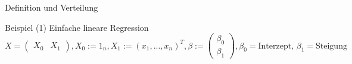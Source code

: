 \documentclass[
  8pt,
  ignorenonframetext,
]{beamer}
\begin{document}
\begin{frame}[fragile]{Definition und Verteilung}
\protect\hypertarget{definition-und-verteilung-4}{}
\vspace{1mm}
\small

Beispiel (1) Einfache lineare Regression \footnotesize \begin{equation}
X = \begin{pmatrix} X_0 & X_1 \end{pmatrix}, X_0 := 1_{n}, X_1 := (x_1,...,x_n)^T,
\beta  := \begin{pmatrix} \beta_0 \\ \beta_1 \end{pmatrix},
\beta_0 = \mbox{Interzept,  }
\beta_1 = \mbox{Steigung }
\end{equation} \tiny


\end{frame}
\end{document}
